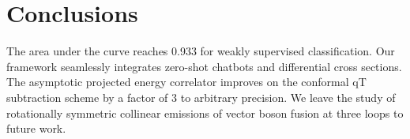 \section{Conclusions}\label{sec:conclusions}

The area under the curve reaches 0.933 for weakly supervised
classification. Our framework seamlessly integrates zero-shot chatbots
and differential cross sections. The asymptotic projected energy
correlator improves on the conformal qT subtraction scheme by a factor
of 3 to arbitrary precision. We leave the study of rotationally
symmetric collinear emissions of vector boson fusion at three loops to
future work.

